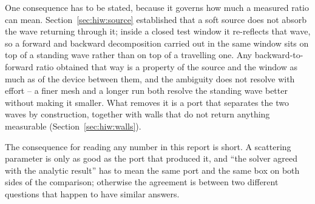 One consequence has to be stated, because it governs how much a measured ratio can mean. Section~\ref{sec:hiw:source}
established that a soft source does not absorb the wave returning through it; inside a closed test window it
re-reflects that wave, so a forward and backward decomposition carried out in the same window sits on top of a
standing wave rather than on top of a travelling one. Any backward-to-forward ratio obtained that way is a
property of the source and the window as much as of the device between them, and the ambiguity does not
resolve with effort -- a finer mesh and a longer run both resolve the standing wave better without making it
smaller. What removes it is a port that separates the two waves by construction, together with walls that do
not return anything measurable (Section~\ref{sec:hiw:walls}).

The consequence for reading any number in this report is short. A scattering parameter is only as good as the
port that produced it, and ``the solver agreed with the analytic result'' has to mean the same port and the
same box on both sides of the comparison; otherwise the agreement is between two different questions that
happen to have similar answers.


